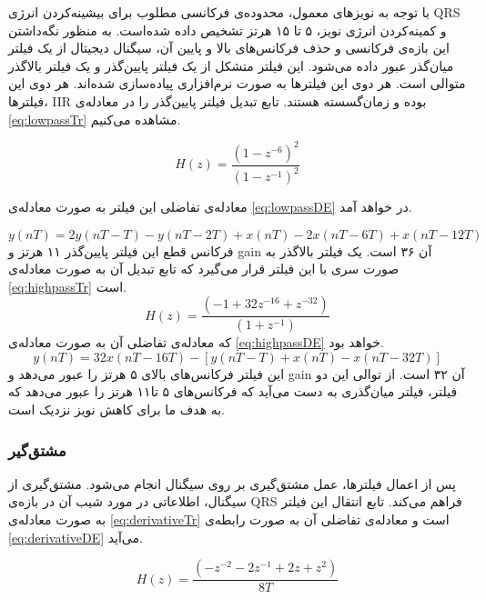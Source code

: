 		با توجه به نویزهای معمول، محدوده‌ی فرکانسی مطلوب برای بیشینه‌کردن انرژی QRS و کمینه‌کردن انرژی نویز، ۵ تا ۱۵ هرتز تشخیص داده شده‌است.\cite{Pan1985} به منظور نگه‌داشتن این بازه‌ی فرکانسی و حذف فرکانس‌های بالا و پایین آن، سیگنال دیجیتال از یک فیلتر میان‌گذر عبور داده می‌شود. این فیلتر متشکل از یک فیلتر پایین‌گذر و یک فیلتر بالاگذر متوالی است. هر دوی این فیلترها به صورت نرم‌افزاری پیاده‌سازی شده‌اند. هر دوی این فیلترها، IIR بوده و زمان‌گسسته هستند. 
تابع تبدیل فیلتر پایین‌گذر را در معادله‌ی \ref{eq:lowpassTr} مشاهده می‌کنیم.

\begin{equation}
	H(z) = \frac{{(1-z^{-6})}^2}{{(1-z^{-1})}^2}
\label{eq:lowpassTr}
\end{equation}
	
	معادله‌ی تفاضلی این فیلتر به صورت معادله‌ی \ref{eq:lowpassDE} در خواهد آمد.
	
\begin{equation}
	y(nT) = 2y(nT-T) - y(nT-2T) + x(nT) - 2x(nT-6T) + x(nT-12T) 
\label{eq:lowpassDE}
\end{equation}
فرکانس قطع این فیلتر پایین‌گذر ۱۱ هرتز و gain آن ۳۶ است. یک فیلتر بالاگذر به صورت سری با این فیلتر قرار می‌گیرد که تابع تبدیل آن به صورت معادله‌ی \ref{eq:highpassTr} است.
\begin{equation}
	H(z) = \frac{{(-1+32z^{-16}+z^{-32})}}{{(1+z^{-1})}}
\label{eq:highpassTr}
\end{equation}
که معادله‌ی تفاضلی آن به صورت معادله‌ی \ref{eq:highpassDE} خواهد بود.
 \begin{equation}
	y(nT) = 32x(nT-16T) - [y(nT-T) + x(nT) - x(nT-32T)]
\label{eq:highpassDE}
\end{equation}
این فیلتر فرکانس‌های بالای ۵ هرتز را عبور می‌دهد و gain آن ۳۲ است. از توالی این دو فیلتر، فیلتر میان‌گذری به دست می‌آید که فرکانس‌های ۵ تا۱۱ هرتز را عبور می‌دهد که به هدف ما برای کاهش نویز نزدیک است. 

\subsubsection{مشتق‌گیر}
پس از اعمال فیلترها، عمل مشتق‌گیری بر روی سیگنال انجام می‌شود. مشتق‌گیری از سیگنال، اطلاعاتی در مورد شیب آن در بازه‌ی QRS فراهم می‌کند. تابع انتقال این فیلتر به صورت معادله‌ی \ref{eq:derivativeTr} است و معادله‌ی تفاضلی آن به صورت رابطه‌ی \ref{eq:derivativeDE} می‌آید.

\begin{equation}
	H(z) = \frac{(-z^{-2}-2z^{-1}+2z+z^2)}{8T}
\label{eq:derivativeTr}
\end{equation}
	
